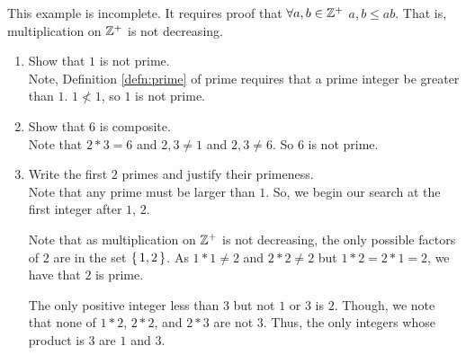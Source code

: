 \guard






This example is incomplete.
It requires proof that $\forall a,b\in\mathbb{Z}^+$ $a,b\leq ab$.
That is, multiplication on $\mathbb{Z}^+$ is not decreasing.

\begin{exmp}
\label{exmp:primeComposite}
  \begin{enumerate}
    \item Show that $1$ is not prime.\\
      Note, Definition \ref{defn:prime} of prime requires that a prime integer be greater than $1$.
      $1\not<1$, so $1$ is not prime.
    \item Show that $6$ is composite.\\
      Note that $2*3=6$ and $2,3\not=1$ and $2,3\not=6$.
      So $6$ is not prime.
      
    \item Write the first $2$ primes and justify their primeness.\\
      Note that any prime must be larger than $1$.
      So, we begin our search at the first integer after $1$, $2$.

      Note that as  multiplication on $\mathbb{Z}^+$ is not decreasing, the only possible factors of $2$ are in the set $\left\{\,1,2\,\right\}$.
      As $1*1\not=2$ and $2*2\not=2$ but $1*2=2*1=2$, we have that $2$ is prime.

      The only positive integer less than $3$ but not $1$ or $3$ is $2$.
      Though, we note that none of $1*2$, $2*2$, and $2*3$ are not $3$.
      Thus, the only integers whose product is $3$ are $1$ and $3$.

  \end{enumerate}
\end{exmp}
